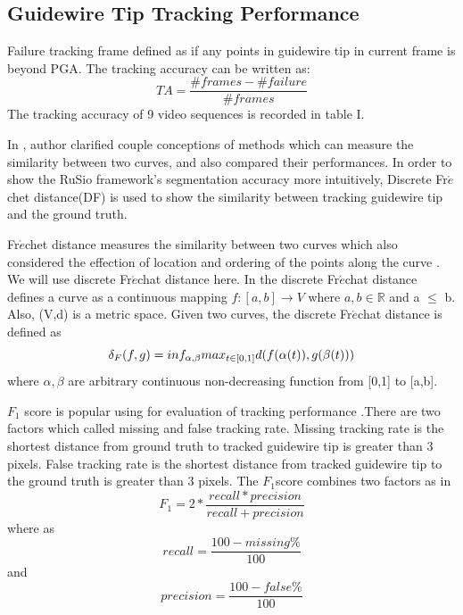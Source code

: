 \documentclass[letterpaper, 10 pt, conference]{ieeeconf}  %
\begin{document}
\subsection{Guidewire Tip Tracking Performance}
Failure tracking frame defined as if any points in guidewire tip in current frame is beyond PGA. The tracking accuracy can be written as: 
\begin{equation}
TA= \frac{\#frames - \#failure}{\#frames}
\end{equation} 
The tracking accuracy of 9 video sequences is recorded in table I. 

In \cite{c12}, author clarified couple conceptions of methods which can measure the similarity between two curves, and also compared their performances. In order to show the RuSio framework’s segmentation accuracy more intuitively, Discrete Fr$\acute{e}$chet distance(DF) is used to show the similarity between tracking guidewire tip and the ground truth.\par
Fr$\acute{e}$chet distance measures the similarity between two curves which also considered the effection of location and ordering of the points along the curve \cite{c13}. We will use discrete Fr$\acute{e}$chat distance here. In\cite{c13} the discrete Fr$\acute{e}$chat distance defines a curve as a continuous mapping $f:[a,b] \rightarrow V$ where $a,b  \in  \mathbb{R}$ and a $\leq$ b. Also, (V,d) is a metric space. Given two curves, the discrete Fr$\acute{e}$chat distance is defined as 
\begin{equation}
\delta_F(f,g) =  inf_{\alpha,\beta}max_{t \in [0,1] }d(f(\alpha(t)),g(\beta(t)))\\
\end{equation}
where $\alpha, \beta$ are arbitrary continuous non-decreasing function from [0,1] to [a,b].\par

$F_{1}$ score is popular using for evaluation of tracking performance \cite{c8}\cite{c14}\cite{c15} .There are two factors which called missing and false tracking rate.
Missing tracking rate is the shortest distance from ground truth to tracked guidewire tip is greater than 3 pixels. 
False tracking rate is the shortest distance from tracked guidewire tip to the ground truth is greater than 3 pixels.
The $F_{1}$score combines two factors as in \cite{c8}\cite{c15}
\begin{equation}
F_{1} = 2*\frac{recall*precision}{recall+precision}
\end{equation}
where as 
\begin{equation}
recall = \frac{100-missing\%}{100}
\end{equation}
and
\begin{equation}
precision = \frac{100-false\%}{100}
\end{equation}
\end{document}
